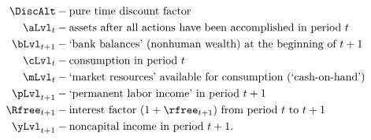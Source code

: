  \begin{equation*}\begin{gathered}\begin{aligned}
        {\DiscAlt}  & - \text{pure time discount factor} \\
        \aLvl_{t}  & - \text{assets after all actions have been accomplished in period $t$} \\
        {\bLvl}_{t+1}  & - \text{`bank balances' (nonhuman wealth) at the beginning of $t+1$} \\
        \cLvl_{t}  & - \text{consumption in period $t$} \\
        \mLvl_{t}  & - \text{`market resources' available for consumption (`cash-on-hand')} \\
        \pLvl_{t+1}  & - \text{`permanent labor income' in period $t+1$} \\
        \Rfree_{t+1}  & - \text{interest factor $(1+\rfree_{t+1})$ from period $t$ to $t+1$ } \\
        {\yLvl}_{t+1}  & - \text{noncapital income in period $t+1$}.
      \end{aligned}\end{gathered}\end{equation*}
